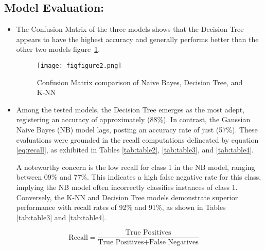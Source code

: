 \documentclass{article}
\begin{document}
\subsection{Model Evaluation:}
\begin{itemize}
\item  The Confusion Matrix of the three models shows that the Decision Tree appears to have the highest accuracy and generally performs better than the other two models figure~\ref{fig:figure2}. 


\vspace{-0.1cm} %
\begin{figure}[!htbp]
    \centering
    \texttt{[image: figfigure2.png]}
    \caption{Confusion Matrix comparison of Naive Bayes, Decision Tree, and K-NN}
    \label{fig:figure2}
\end{figure}




\item Among the tested models, the Decision Tree emerges as the most adept, registering an accuracy of approximately (88\%). In contrast, the Gaussian Naive Bayes (NB) model lags, posting an accuracy rate of just (57\%). These evaluations were grounded in the recall computations delineated by equation \ref{eq:recall}, as exhibited in Tables \ref{tab:table2}, \ref{tab:table3}, and \ref{tab:table4}.

A noteworthy concern is the low recall for class 1 in the NB model, ranging between 09\% and 77\%. This indicates a high false negative rate for this class, implying the NB model often incorrectly classifies instances of class 1. Conversely, the K-NN and Decision Tree models demonstrate superior performance with recall rates of 92\% and 
91\%, as shown in Tables \ref{tab:table3} and \ref{tab:table4}.
\end{itemize}



\begin{equation}
    \text{Recall} = \frac{\text{True Positives}}{\text{True Positives} + \text{False Negatives}}
    \label{eq:recall}
\end{equation}
\end{document}
